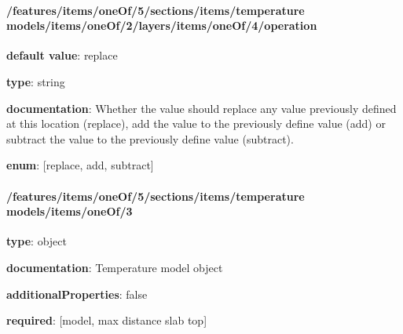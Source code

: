 \begin{itemized}
\end{itemized}\paragraph{/features/items/oneOf/5/sections/items/temperature models/items/oneOf/2/layers/items/oneOf/4/operation} \begin{itemized}
\item {\bf default value}: replace
\item {\bf type}: string
\item {\bf documentation}: Whether the value should replace any value previously defined at this location (replace), add the value to the previously define value (add) or subtract the value to the previously define value (subtract).
\item {\bf enum}: [replace, add, subtract]\end{itemized}\paragraph{/features/items/oneOf/5/sections/items/temperature models/items/oneOf/3} \begin{itemized}
\item {\bf type}: object
\item {\bf documentation}: Temperature model object
\item {\bf additionalProperties}: false
\item {\bf required}: [model, max distance slab top]\end{itemized}
